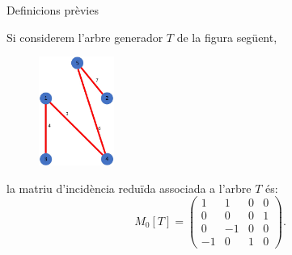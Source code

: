 \documentclass{beamer}
\begin{document}
\begin{frame}{Definicions prèvies}
    \begin{exampleblock}{}
        Si considerem l'arbre generador $T$ de la figura següent,
        \begin{figure}
            \centering
            \includegraphics[width=2.45cm]{Imatges/exemple2.jpg}
        \end{figure}\pause
        la matriu d'incidència reduïda associada a l'arbre $T$ és:
        $$M_0[T]=
            \begin{pmatrix}
                1  & 1  & 0 & 0 \\
                0  & 0  & 0 & 1 \\
                0  & -1 & 0 & 0 \\
                -1 & 0  & 1 & 0
            \end{pmatrix}.
        $$
    \end{exampleblock}
\end{frame}
\end{document}

